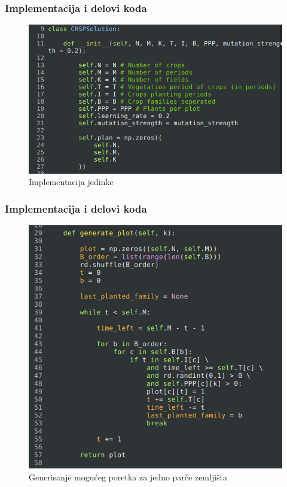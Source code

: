 \documentclass{beamer}
\begin{document}
\begin{frame}

  \frametitle{Implementacija i delovi koda}

  \begin{figure}
    \includegraphics[height=0.7\textheight]{slike/CRSPSolution.png}
    \caption{Implementacija jedinke}
  \end{figure}

\end{frame}
\begin{frame}

  \frametitle{Implementacija i delovi koda}

  \begin{figure}
    \includegraphics[height=0.7\textheight]{slike/generate_plot.png}
    \caption{Generisanje mogućeg poretka za jedno parče zemljišta}
  \end{figure}

\end{frame}
\end{document}
